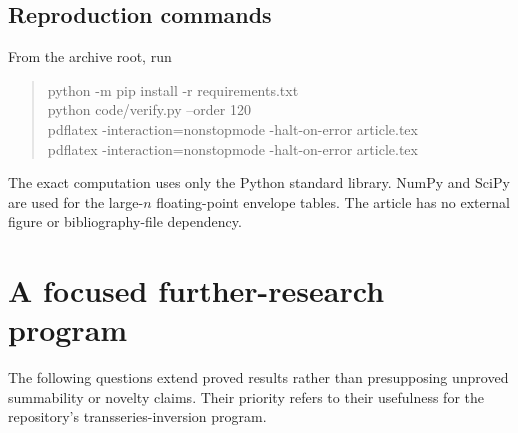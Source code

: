 \documentclass[11pt,a4paper]{article}
\numberwithin{equation}{section}
\theoremstyle{definition}
\theoremstyle{remark}
\begin{document}
\subsection{Reproduction commands}
From the archive root, run
\begin{quote}\ttfamily\small
python -m pip install -r requirements.txt\\
python code/verify.py --order 120\\
pdflatex -interaction=nonstopmode -halt-on-error article.tex\\
pdflatex -interaction=nonstopmode -halt-on-error article.tex
\end{quote}
The exact computation uses only the Python standard library.  NumPy and
SciPy are used for the large-$n$ floating-point envelope tables.
The article has no external figure or bibliography-file dependency.

\section{A focused further-research program}
\label{sec:future}

The following questions extend proved results rather than presupposing
unproved summability or novelty claims.  Their priority refers to their
usefulness for the repository's transseries-inversion program.
\end{document}
